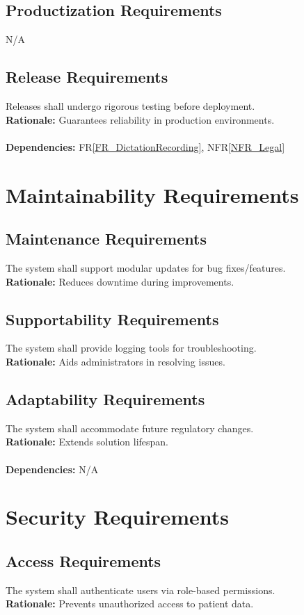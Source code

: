 \documentclass[12pt]{article}
\begin{document}
\subsection{Productization Requirements}
N/A

\subsection{Release Requirements}
Releases shall undergo rigorous testing before deployment.  \\
\textbf{Rationale:} Guarantees reliability in production environments. \\
  \\
\textbf{Dependencies:} FR\ref{FR_DictationRecording}, NFR\ref{NFR_Legal}

\section{Maintainability Requirements} \label{NFR_Maintainability}
\subsection{Maintenance Requirements}
The system shall support modular updates for bug fixes/features.  \\
\textbf{Rationale:} Reduces downtime during improvements.

\subsection{Supportability Requirements}
The system shall provide logging tools for troubleshooting.  \\
\textbf{Rationale:} Aids administrators in resolving issues.

\subsection{Adaptability Requirements}
The system shall accommodate future regulatory changes.  \\
\textbf{Rationale:} Extends solution lifespan. \\
  \\
\textbf{Dependencies:} N/A

\section{Security Requirements} \label{NFR_Security}
\subsection{Access Requirements}
The system shall authenticate users via role-based permissions.  \\
\textbf{Rationale:} Prevents unauthorized access to patient data.
\end{document}
